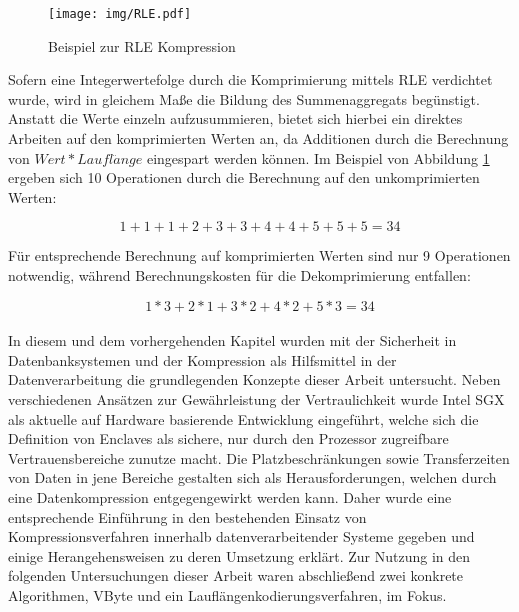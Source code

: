 \begin{figure}
	\texttt{[image: img/RLE.pdf]}
	\centering
	\caption{Beispiel zur RLE Kompression}
	\label{fig:rle}
\end{figure}

Sofern eine Integerwertefolge durch die Komprimierung mittels \ac{RLE} verdichtet wurde, wird in gleichem Maße die Bildung des Summenaggregats begünstigt. Anstatt die Werte einzeln aufzusummieren, bietet sich hierbei ein direktes Arbeiten auf den komprimierten Werten an, da Additionen durch die Berechnung von $Wert * Laufl\ddot{a}nge$ eingespart werden können. Im Beispiel von Abbildung \ref{fig:rle} ergeben sich 10 Operationen durch die Berechnung auf den unkomprimierten Werten:

\begin{equation*}
	1 + 1 + 1 + 2 + 3 + 3 + 4 + 4 + 5 + 5 + 5 = 34
\end{equation*}

Für entsprechende Berechnung auf komprimierten Werten sind nur 9 Operationen notwendig, während Berechnungskosten für die Dekomprimierung entfallen:

\begin{equation*}
	1 * 3 + 2 * 1 + 3 * 2 + 4 * 2 + 5 * 3 = 34
\end{equation*}

\paragraph{}
In diesem und dem vorhergehenden Kapitel wurden mit der Sicherheit in Datenbanksystemen und der Kompression als Hilfsmittel in der Datenverarbeitung die grundlegenden Konzepte dieser Arbeit untersucht. Neben verschiedenen Ansätzen zur Gewährleistung der Vertraulichkeit wurde Intel \ac{SGX} als aktuelle auf Hardware basierende Entwicklung eingeführt, welche sich die Definition von Enclaves als sichere, nur durch den Prozessor zugreifbare Vertrauensbereiche zunutze macht.
Die Platzbeschränkungen sowie Transferzeiten von Daten in jene Bereiche gestalten sich als Herausforderungen, welchen durch eine Datenkompression entgegengewirkt werden kann. Daher wurde eine entsprechende Einführung in den bestehenden Einsatz von Kompressionsverfahren innerhalb datenverarbeitender Systeme gegeben und einige Herangehensweisen zu deren Umsetzung erklärt. Zur Nutzung in den folgenden Untersuchungen dieser Arbeit waren abschließend zwei konkrete Algorithmen, VByte und ein Lauflängenkodierungsverfahren, im Fokus.
